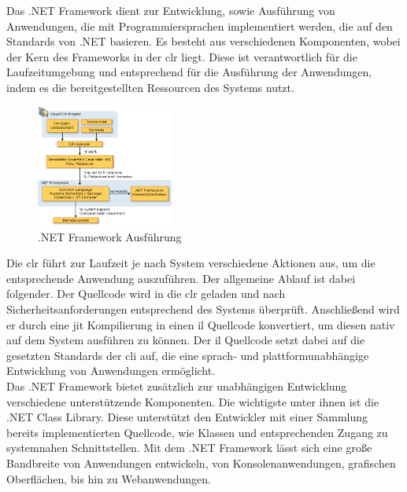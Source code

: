 Das .NET Framework dient zur Entwicklung, sowie Ausführung von Anwendungen, die mit Programmiersprachen implementiert werden, die auf den Standards von .NET basieren. Es besteht aus verschiedenen Komponenten, wobei der Kern des Frameworks in der \gls{clr} liegt. Diese ist verantwortlich für die Laufzeitumgebung und entsprechend für die Ausführung der Anwendungen, indem es die bereitgestellten Ressourcen des Systems nutzt.\\
\begin{figure}
	\begin{center}
		\includegraphics[width=0.4\textwidth]{images/technische_grundlagen/net_aufbau.jpeg}
	\end{center}
	\caption{.NET Framework Ausführung}
	\label{fig:net}
\end{figure}

\noindent
Die \gls{clr} führt zur Laufzeit je nach System verschiedene Aktionen aus, um die entsprechende Anwendung auszuführen. Der allgemeine Ablauf ist dabei folgender. Der Quellcode wird in die \gls{clr} geladen und nach Sicherheitsanforderungen entsprechend des Systems überprüft. Anschließend wird er durch eine \gls{jit} Kompilierung in einen \gls{il} Quellcode konvertiert, um diesen nativ auf dem System ausführen zu können. Der \gls{il} Quellcode setzt dabei auf die gesetzten Standards der \gls{cli} auf, die eine sprach- und plattformunabhängige Entwicklung von Anwendungen ermöglicht.\\
Das .NET Framework bietet zusätzlich zur unabhängigen Entwicklung verschiedene unterstützende Komponenten. Die wichtigste unter ihnen ist die .NET Class Library. Diese unterstützt den Entwickler mit einer Sammlung bereits implementierten Quellcode, wie Klassen und entsprechenden Zugang zu systemnahen Schnittstellen. Mit dem .NET Framework lässt sich eine große Bandbreite von Anwendungen entwickeln, von Konsolenanwendungen, grafischen Oberflächen, bis hin zu Webanwendungen.\\

